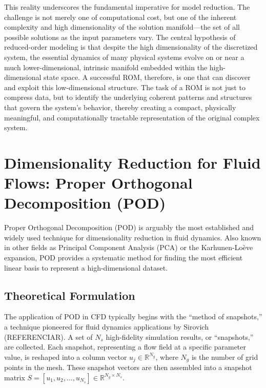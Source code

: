 \documentclass[dsc, EN]{ufabcFHZh}
\begin{document}
{This reality underscores the fundamental imperative for model reduction. The challenge is not merely one of computational cost, but one of the inherent complexity and high dimensionality of the solution manifold—the set of all possible solutions as the input parameters vary. The central hypothesis of reduced-order modeling is that despite the high dimensionality of the discretized system, the essential dynamics of many physical systems evolve on or near a much lower-dimensional, intrinsic manifold embedded within the high-dimensional state space. A successful ROM, therefore, is one that can discover and exploit this low-dimensional structure. The task of a ROM is not just to compress data, but to identify the underlying coherent patterns and structures that govern the system's behavior, thereby creating a compact, physically meaningful, and computationally tractable representation of the original complex system.

\section{Dimensionality Reduction for Fluid Flows: Proper Orthogonal Decomposition (POD)}

Proper Orthogonal Decomposition (POD) is arguably the most established and widely used technique for dimensionality reduction in fluid dynamics. Also known in other fields as Principal Component Analysis (PCA) or the Karhunen-Loève expansion, POD provides a systematic method for finding the most efficient linear basis to represent a high-dimensional dataset. 


\subsection{Theoretical Formulation}

The application of POD in CFD typically begins with the ``method of snapshots,'' a technique pioneered for fluid dynamics applications by Sirovich (REFERENCIAR). A set of $N_s$ high-fidelity simulation results, or ``snapshots,'' are collected. Each snapshot, representing a flow field at a specific parameter value, is reshaped into a column vector $u_j \in \mathbb{R}^{N_g}$, where $N_g$ is the number of grid points in the mesh. These snapshot vectors are then assembled into a snapshot matrix $S=[u_1, u_2, ..., u_{N_s}] \in \mathbb{R}^{N_g \times N_s}$.

}
\end{document}
